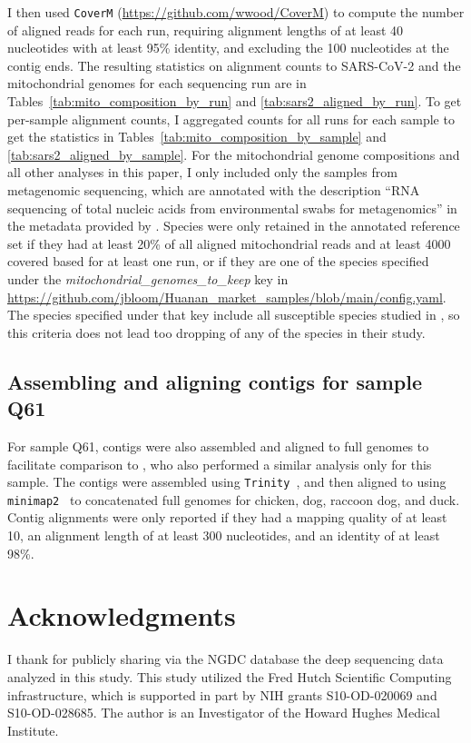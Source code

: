 \documentclass[9pt,twocolumn,twoside]{gsajnl_modified}
\begin{document}
{I then used \texttt{CoverM} (\url{https://github.com/wwood/CoverM}) to compute the number of aligned reads for each run, requiring alignment lengths of at least 40 nucleotides with at least 95\% identity, and excluding the 100 nucleotides at the contig ends.
The resulting statistics on alignment counts to SARS-CoV-2 and the mitochondrial genomes for each sequencing run are in Tables~\ref{tab:mito_composition_by_run} and \ref{tab:sars2_aligned_by_run}.
To get per-sample alignment counts, I aggregated counts for all runs for each sample to get the statistics in Tables~\ref{tab:mito_composition_by_sample} and \ref{tab:sars2_aligned_by_sample}.
For the mitochondrial genome compositions and all other analyses in this paper, I only included only the samples from metagenomic sequencing, which are annotated with the description ``RNA sequencing of total nucleic acids from environmental swabs for metagenomics'' in the metadata provided by \citet{liu2023surveillance}.
Species were only retained in the annotated reference set if they had at least 20\% of all aligned mitochondrial reads and at least 4000 covered based for at least one run, or if they are one of the species specified under the \textit{mitochondrial\_genomes\_to\_keep} key in \url{https://github.com/jbloom/Huanan_market_samples/blob/main/config.yaml}.
The species specified under that key include all susceptible species studied in \citet{crits2023genetic}, so this criteria does not lead too dropping of any of the species in their study.

\subsection{Assembling and aligning contigs for sample Q61}
For sample Q61, contigs were also assembled and aligned to full genomes to facilitate comparison to \citet{crits2023genetic}, who also performed a similar analysis only for this sample.
The contigs were assembled using \texttt{Trinity}~\citep{grabherr2011trinity}, and then aligned to using \texttt{minimap2}~\citep{li2018minimap2} to concatenated full genomes for chicken, dog, raccoon dog, and duck.
Contig alignments were only reported if they had a mapping quality of at least 10, an alignment length of at least 300 nucleotides, and an identity of at least 98\%.

\section{Acknowledgments}
I thank \citet{liu2023surveillance} for publicly sharing via the NGDC database the deep sequencing data analyzed in this study.
This study utilized the Fred Hutch Scientific Computing infrastructure, which is supported in part by NIH grants S10-OD-020069 and S10-OD-028685.
The author is an Investigator of the Howard Hughes Medical Institute.

}
\end{document}
